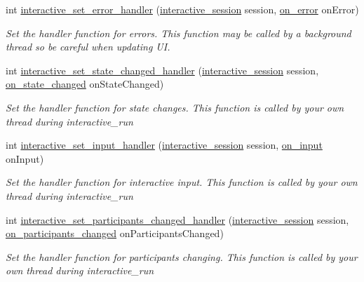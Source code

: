 \begin{DoxyCompactItemize}
int \mbox{\hyperlink{group___interactivity_gaf1bd8c3789d9a98969d484e68107bbc5}{interactive\+\_\+set\+\_\+error\+\_\+handler}} (\mbox{\hyperlink{group___interactivity_ga6d8819d38b8dc8994a2299cf22a65a31}{interactive\+\_\+session}} session, \mbox{\hyperlink{group___interactivity_gabb1eefe2ce4247a4562fe1f231a35144}{on\+\_\+error}} on\+Error)
\begin{DoxyCompactList}\small\item\em Set the handler function for errors. This function may be called by a background thread so be careful when updating UI. \end{DoxyCompactList}\item 
int \mbox{\hyperlink{group___interactivity_ga082b1797dc40ac1fa9abcaedf0502d89}{interactive\+\_\+set\+\_\+state\+\_\+changed\+\_\+handler}} (\mbox{\hyperlink{group___interactivity_ga6d8819d38b8dc8994a2299cf22a65a31}{interactive\+\_\+session}} session, \mbox{\hyperlink{group___interactivity_ga2decafcde365ca3bc6907760ef4fcc5f}{on\+\_\+state\+\_\+changed}} on\+State\+Changed)
\begin{DoxyCompactList}\small\item\em Set the handler function for state changes. This function is called by your own thread during {\ttfamily interactive\+\_\+run} \end{DoxyCompactList}\item 
int \mbox{\hyperlink{group___interactivity_ga401b15a543742936f4c3f2e70110a662}{interactive\+\_\+set\+\_\+input\+\_\+handler}} (\mbox{\hyperlink{group___interactivity_ga6d8819d38b8dc8994a2299cf22a65a31}{interactive\+\_\+session}} session, \mbox{\hyperlink{group___interactivity_gabc1d56c93e90e83489bc9200a467a9b6}{on\+\_\+input}} on\+Input)
\begin{DoxyCompactList}\small\item\em Set the handler function for interactive input. This function is called by your own thread during {\ttfamily interactive\+\_\+run} \end{DoxyCompactList}\item 
int \mbox{\hyperlink{group___interactivity_gaa38200c346ef499a6c78a66b1c558e9d}{interactive\+\_\+set\+\_\+participants\+\_\+changed\+\_\+handler}} (\mbox{\hyperlink{group___interactivity_ga6d8819d38b8dc8994a2299cf22a65a31}{interactive\+\_\+session}} session, \mbox{\hyperlink{group___interactivity_ga37e53b2d79a8ef8dbb6adae640e53779}{on\+\_\+participants\+\_\+changed}} on\+Participants\+Changed)
\begin{DoxyCompactList}\small\item\em Set the handler function for participants changing. This function is called by your own thread during {\ttfamily interactive\+\_\+run} \end{DoxyCompactList}\item 

\end{DoxyCompactItemize}
